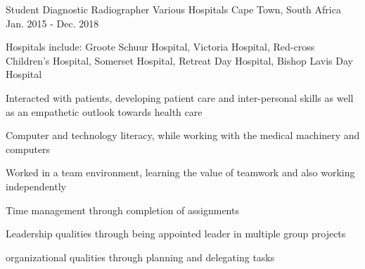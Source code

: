 

\begin{cventries}

  \cventry
    {Student Diagnostic Radiographer} %
    {Various Hospitals} %
    {Cape Town, South Africa} %
    {Jan. 2015 - Dec. 2018} %
    {
      \begin{cvitems} %
        \item {Hospitals include: Groote Schuur Hospital, Victoria Hospital, Red-cross Children's Hospital, Somerset Hospital, Retreat Day Hospital, Bishop Lavis Day Hospital}
        \item {Interacted with patients, developing patient care and inter-personal skills as well as an empathetic outlook towards health care}
        \item {Computer and technology literacy, while working with the medical machinery and computers}
        \item {Worked in a team environment, learning the value of teamwork and also working independently}
        \item {Time management through completion of assignments}
        \item {Leadership qualities through being appointed leader in multiple group projects}
        \item {organizational qualities through planning and delegating tasks}
      \end{cvitems}
    }

\end{cventries}
